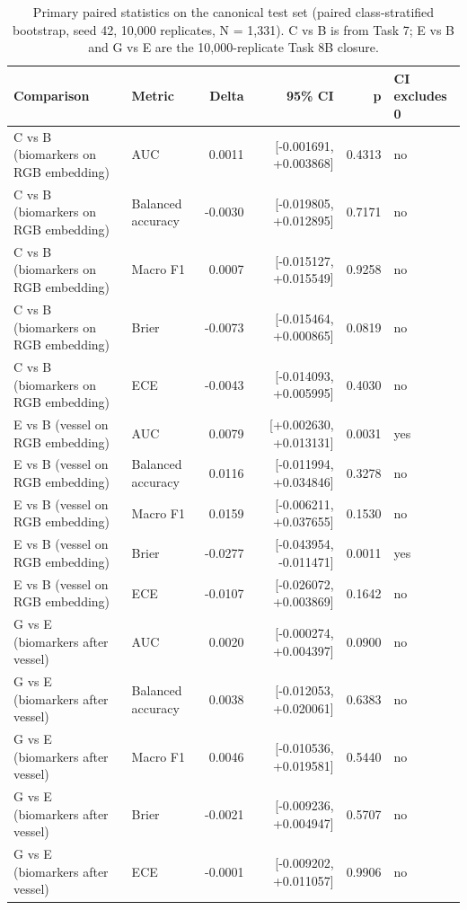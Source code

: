 \begin{table}[htbp]
\centering
\small
\caption{Primary paired statistics on the canonical test set (paired class-stratified bootstrap, seed 42, 10,000 replicates, N = 1,331). C vs B is from Task 7; E vs B and G vs E are the 10,000-replicate Task 8B closure.}
\label{tab:primarypaired}
\begin{tabular}{p{5.0cm}lrrrl}
\toprule
Comparison & Metric & Delta & 95\% CI & p & CI excludes 0 \\
\midrule
C vs B (biomarkers on RGB embedding) & AUC & 0.0011 & [-0.001691, +0.003868] & 0.4313 & no \\
C vs B (biomarkers on RGB embedding) & Balanced accuracy & -0.0030 & [-0.019805, +0.012895] & 0.7171 & no \\
C vs B (biomarkers on RGB embedding) & Macro F1 & 0.0007 & [-0.015127, +0.015549] & 0.9258 & no \\
C vs B (biomarkers on RGB embedding) & Brier & -0.0073 & [-0.015464, +0.000865] & 0.0819 & no \\
C vs B (biomarkers on RGB embedding) & ECE & -0.0043 & [-0.014093, +0.005995] & 0.4030 & no \\
E vs B (vessel on RGB embedding) & AUC & 0.0079 & [+0.002630, +0.013131] & 0.0031 & yes \\
E vs B (vessel on RGB embedding) & Balanced accuracy & 0.0116 & [-0.011994, +0.034846] & 0.3278 & no \\
E vs B (vessel on RGB embedding) & Macro F1 & 0.0159 & [-0.006211, +0.037655] & 0.1530 & no \\
E vs B (vessel on RGB embedding) & Brier & -0.0277 & [-0.043954, -0.011471] & 0.0011 & yes \\
E vs B (vessel on RGB embedding) & ECE & -0.0107 & [-0.026072, +0.003869] & 0.1642 & no \\
G vs E (biomarkers after vessel) & AUC & 0.0020 & [-0.000274, +0.004397] & 0.0900 & no \\
G vs E (biomarkers after vessel) & Balanced accuracy & 0.0038 & [-0.012053, +0.020061] & 0.6383 & no \\
G vs E (biomarkers after vessel) & Macro F1 & 0.0046 & [-0.010536, +0.019581] & 0.5440 & no \\
G vs E (biomarkers after vessel) & Brier & -0.0021 & [-0.009236, +0.004947] & 0.5707 & no \\
G vs E (biomarkers after vessel) & ECE & -0.0001 & [-0.009202, +0.011057] & 0.9906 & no \\
\bottomrule
\end{tabular}
\end{table}
